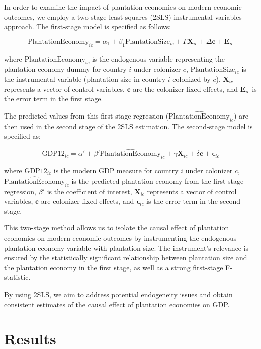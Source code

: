 \documentclass[12pt]{article}
\begin{document}
\vspace{0.2 in} 
\noindent In order to examine the impact of plantation economies on modern economic outcomes, we employ a two-stage least squares (2SLS) instrumental variables approach. The first-stage model is specified as follows:

\[
\text{PlantationEconomy}_{ic} = \alpha_1 + \beta_1 \text{PlantationSize}_{ic} + \Gamma \mathbf{X}_{ic} + \Delta \mathbf{c} + \mathbf{E}_{ic}
\]

\noindent where \( \text{PlantationEconomy}_{ic} \) is the endogenous variable representing the plantation economy dummy for country \( i \) under colonizer \( c \), \( \text{PlantationSize}_{ic} \) is the instrumental variable (plantation size in country \( i \) colonized by \( c \)), \( \mathbf{X}_{ic} \) represents a vector of control variables, \( \mathbf{c} \) are the colonizer fixed effects, and \( \mathbf{E}_{ic} \) is the error term in the first stage.

\noindent The predicted values from this first-stage regression (\( \hat{\text{PlantationEconomy}}_{ic} \)) are then used in the second stage of the 2SLS estimation. The second-stage model is specified as:

\[
\text{GDP12}_{ic} = \alpha' + \beta' \hat{\text{PlantationEconomy}}_{ic} + \gamma \mathbf{X}_{ic} + \delta \mathbf{c} + \boldsymbol{\epsilon}_{ic}
\]

\noindent where \( \text{GDP12}_{ic} \) is the modern GDP measure for country \( i \) under colonizer \( c \), \( \hat{\text{PlantationEconomy}}_{ic} \) is the predicted plantation economy from the first-stage regression, \( \beta' \) is the coefficient of interest, \( \mathbf{X}_{ic} \) represents a vector of control variables, \( \mathbf{c} \) are colonizer fixed effects, and \( \boldsymbol{\epsilon}_{ic} \) is the error term in the second stage.

\noindent This two-stage method allows us to isolate the causal effect of plantation economies on modern economic outcomes by instrumenting the endogenous plantation economy variable with plantation size. The instrument's relevance is ensured by the statistically significant relationship between plantation size and the plantation economy in the first stage, as well as a strong first-stage F-statistic.

\noindent By using 2SLS, we aim to address potential endogeneity issues and obtain consistent estimates of the causal effect of plantation economies on GDP.

\section{Results}
\end{document}
